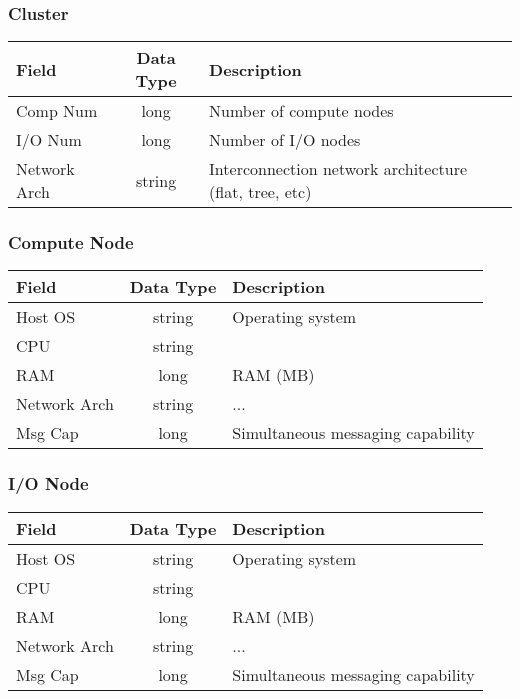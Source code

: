 \documentclass[9pt]{article}
\begin{document}
\subsubsection{Cluster}
\label{sec:Cluster}
\begin{center}
	\begin{tabular}{l | c | l}
		Field & Data Type & Description\\\hline
		Comp Num & long & Number of compute nodes\\
		I/O Num & long & Number of I/O nodes\\
		Network Arch & string & Interconnection network architecture (flat, tree, etc)\\
	\end{tabular}
\end{center}

\subsubsection{Compute Node}
\label{sec:ComputeNode}
\begin{center}
	\begin{tabular}{l | c | l}
		Field & Data Type & Description\\\hline
		Host OS & string & Operating system\\
		CPU & string & \\
		RAM & long & RAM (MB)\\
		Network Arch & string & ...\\
		Msg Cap & long & Simultaneous messaging capability\\		
	\end{tabular}
\end{center}

\subsubsection{I/O Node}
\label{sec:IONode}
\begin{center}
	\begin{tabular}{l | c | l}
		Field & Data Type & Description\\\hline
		Host OS & string & Operating system\\
		CPU & string & \\
		RAM & long & RAM (MB) \\
		Network Arch & string & ...\\
		Msg Cap & long & Simultaneous messaging capability\\
	\end{tabular}
\end{center}
\end{document}
